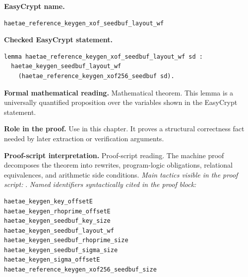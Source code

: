\begin{formaltheorem}
\noindent\textbf{EasyCrypt name.}
\begin{lstlisting}[language=EasyCrypt,basicstyle=\ttfamily\scriptsize]
haetae_reference_keygen_xof_seedbuf_layout_wf
\end{lstlisting}
\noindent\textbf{Checked EasyCrypt statement.}
\begin{lstlisting}[language=EasyCrypt,basicstyle=\ttfamily\scriptsize]
lemma haetae_reference_keygen_xof_seedbuf_layout_wf sd :
  haetae_keygen_seedbuf_layout_wf
    (haetae_reference_keygen_xof256_seedbuf sd).
\end{lstlisting}
\noindent\textbf{Formal mathematical reading.}
Mathematical theorem. This lemma is a universally quantified proposition over the variables shown in the EasyCrypt statement.

\noindent\textbf{Role in the proof.}
Use in this chapter. It proves a structural correctness fact needed by later extraction or verification arguments.

\noindent\textbf{Proof-script interpretation.}
Proof-script reading. The machine proof decomposes the theorem into rewrites, program-logic obligations, relational equivalences, and arithmetic side conditions.
\emph{Main tactics visible in the proof script:} .
\emph{Named identifiers syntactically cited in the proof block:}
\begin{lstlisting}[language=EasyCrypt,basicstyle=\ttfamily\scriptsize]
haetae_keygen_key_offsetE
haetae_keygen_rhoprime_offsetE
haetae_keygen_seedbuf_key_size
haetae_keygen_seedbuf_layout_wf
haetae_keygen_seedbuf_rhoprime_size
haetae_keygen_seedbuf_sigma_size
haetae_keygen_sigma_offsetE
haetae_reference_keygen_xof256_seedbuf_size
\end{lstlisting}

\end{formaltheorem}

